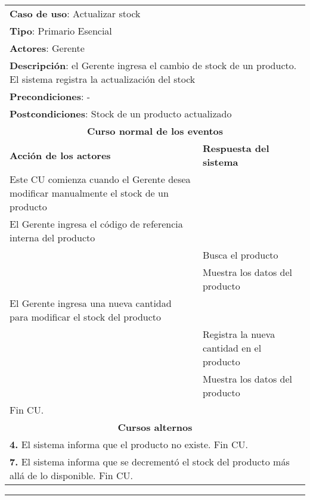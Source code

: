 


	\begin{longtable}{ |p{8cm}|p{8cm}| }
		\hline
		\multicolumn{2}{|p{16cm}|}{\textbf{Caso de uso}: Actualizar stock}\\
		\multicolumn{2}{|p{16cm}|}{\textbf{Tipo}: Primario Esencial}\\
		\multicolumn{2}{|p{16cm}|}{\textbf{Actores}: Gerente}\\
        \multicolumn{2}{|p{16cm}|}{\textbf{Descripción}: el Gerente ingresa el cambio de stock de un producto. El sistema registra la actualización del stock}\\
		\multicolumn{2}{|p{16cm}|}{\textbf{Precondiciones}: -}\\
        \multicolumn{2}{|p{16cm}|}{\textbf{Postcondiciones}: Stock de un producto actualizado}\\
		\hline
		\multicolumn{2}{|c|}{\textbf{Curso normal de los eventos}}\\
		\hline
		\textbf{Acción de los actores} & \textbf{Respuesta del sistema}\\
		\hline
			\inc Este CU comienza cuando el Gerente desea modificar manualmente el stock de un producto& \\
			\hline
			\inc  El Gerente ingresa el código de referencia interna del producto& \\
			\hline
			& \inc Busca el producto \\
			\hline
			& \inc Muestra los datos del producto\\
			\hline


			\inc El Gerente ingresa una nueva cantidad para modificar el stock del producto & \\
			\hline
			& \inc Registra la nueva cantidad en el producto\\
			\hline
			& \inc Muestra los datos del producto\\
			\hline
			\inc Fin CU. & \\


		\hline
		\multicolumn{2}{|c|}{\textbf{Cursos alternos}}\\
		\hline
		\multicolumn{2}{|p{16cm}|}{\textbf{4. }El sistema informa que el producto no existe. Fin CU.}\\
		\hline
		\multicolumn{2}{|p{16cm}|}{\textbf{7. }El sistema informa que se decrementó el stock del producto más allá de lo disponible. Fin CU.}\\
		\hline
	\end{longtable}


    \setcounter{step}{0}

    \noindent\rule{169mm}{0.8mm}\\
